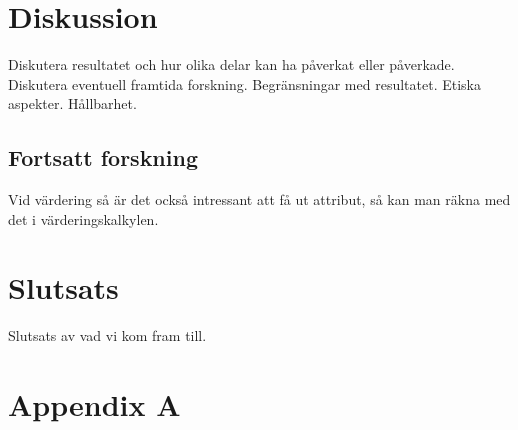 \documentclass[]{kththesis}
\begin{document}
\chapter{Diskussion}
Diskutera resultatet och hur olika delar kan ha påverkat eller påverkade. Diskutera eventuell framtida forskning. Begränsningar med resultatet. Etiska aspekter. Hållbarhet.

\section{Fortsatt forskning}
Vid värdering så är det också intressant att få ut attribut, så kan man räkna med det i värderingskalkylen.

\chapter{Slutsats}  
Slutsats av vad vi kom fram till.

\printbibliography[heading=bibintoc]
\appendix
  \chapter{Appendix A}

\tailmatter
\end{document}
